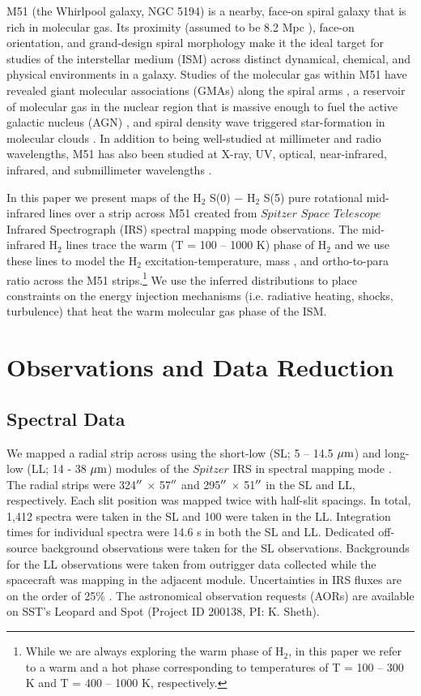 \documentclass[manuscript]{aastex}
\begin{document}
M51 (the Whirlpool galaxy, NGC 5194) is a nearby,
face-on spiral galaxy that is rich in molecular gas.  Its proximity
(assumed to be 8.2 Mpc \citep{tul88}), face-on orientation, and
grand-design spiral morphology make it the ideal target for
studies of the interstellar medium (ISM) across distinct dynamical,
chemical, and physical environments in a galaxy.  Studies of the
molecular gas within M51 have revealed giant molecular associations
(GMAs) along the spiral arms \citep{vog88,ran90,aal99}, a reservoir 
of molecular gas in the nuclear region that is massive enough 
to fuel the active galactic nucleus (AGN) \citep{sco98}, and spiral density wave 
triggered star-formation in molecular clouds \citep{vog88}.
In addition to being well-studied at millimeter and radio wavelengths,
M51 has also been studied at X-ray, UV, optical, near-infrared,
infrared, and submillimeter wavelengths \citep{pal85, ter98, sco01,
  cal05, mat04}.  
  
In this paper we present maps of the  
$\mathrm{H_2}$ S(0) $-$ $\mathrm{H_2}$ S(5) pure rotational 
mid-infrared lines over a strip across M51 
created from $Spitzer$ $Space$ $Telescope$ 
Infrared Spectrograph (IRS) spectral mapping mode observations.
The mid-infrared H$_2$ lines trace the warm (T = 100 -- 1000 K) phase 
of H$_2$ and we use these lines to model the $\mathrm{H_2}$ 
 excitation-temperature, mass \citep{rig02, hig06}, and ortho-to-para ratio 
 \citep{neu98, neu06} across the M51 strips.\footnote{While we 
 are always exploring the warm phase of H$_2$, in this paper 
 we refer to a warm and a hot phase corresponding to 
 temperatures of T = 100 -- 300 K and T = 400 -- 1000 K, 
 respectively.}  We use the inferred distributions to  place constraints 
 on the energy injection mechanisms (i.e. radiative heating, 
 shocks, turbulence) that heat the warm molecular gas 
 phase of the ISM.

\section{Observations and Data Reduction}

\subsection{Spectral Data}

We mapped a radial strip across  using the short-low
(SL; 5 -- 14.5 $\mbox{$\mu$m}$) and long-low (LL; 14 - 38 $\mbox{$\mu$m}$) 
modules of the $Spitzer$ IRS in spectral
mapping mode \citep{hou04}.  The radial strips were 324$\mbox{$^{\prime\prime}$}$ $\times$
57$\mbox{$^{\prime\prime}$}$ and 295$\mbox{$^{\prime\prime}$}$ $\times$ 51$\mbox{$^{\prime\prime}$}$ in the SL and LL,
respectively.  Each slit position was mapped twice with half-slit spacings.  In
total, 1,412 spectra were taken in the SL and 100 were taken in the LL.  
Integration times for individual 
spectra were 14.6 s in both the SL and LL.  Dedicated off-source 
background observations were taken for the SL observations.  Backgrounds for the
LL observations were taken from outrigger data collected while the
spacecraft was mapping in the adjacent module.  Uncertainties in 
IRS fluxes are on the order of 25\% \citep{smi04}.  The astronomical
observation requests (AORs) are available on SST's Leopard and Spot
(Project ID 200138, PI: K. Sheth).
\end{document}
